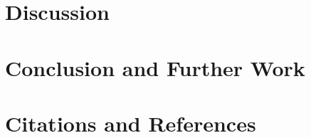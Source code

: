  \clearpage
\section{Discussion}

\clearpage
\section{Conclusion and Further Work}


\clearpage
\section{Citations and References}
\printbibliography

\clearpage
\begin{appendices}

\clearpage

\clearpage

\clearpage
\end{appendices}

